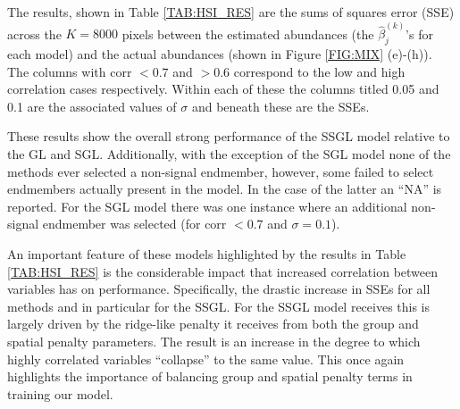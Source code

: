 \documentclass{article}
\numberwithin{equation}{section}
\theoremstyle{plain}
\begin{document}
The results, shown in Table \ref{TAB:HSI_RES} are the sums of squares error
(SSE) across the $K = 8000$ pixels between the estimated abundances (the
$\hat{\beta}_j^{(k)}$'s for each model) and the actual abundances (shown in
Figure \ref{FIG:MIX} (e)-(h)). The columns with corr $< 0.7$ and $> 0.6$
correspond to the low and high correlation cases respectively. Within each of
these the columns titled 0.05 and 0.1 are the associated values of $\sigma$ and
beneath these are the SSEs. 

These results show the overall strong performance of the SSGL model relative to
the GL and SGL. Additionally, with the exception of the SGL model none of the
methods ever selected a non-signal endmember, however, some failed to select
endmembers actually present in the model. In the case of the latter an ``NA'' is
reported.
For the SGL model there was one instance where an additional non-signal
endmember was selected (for corr $< 0.7$ and $\sigma = 0.1$).

An important feature of these models highlighted by the results in Table
\ref{TAB:HSI_RES} is the considerable impact that increased correlation between
variables has on performance. Specifically, the drastic increase in SSEs for all
methods and in particular for the SSGL.
For the SSGL model receives this is largely driven by the ridge-like penalty it
receives from both the group and spatial penalty parameters. The result is an
increase in the degree to which highly correlated variables ``collapse'' to the
same value. This once again highlights the importance of balancing group and
spatial penalty terms in training our model.
\end{document}
